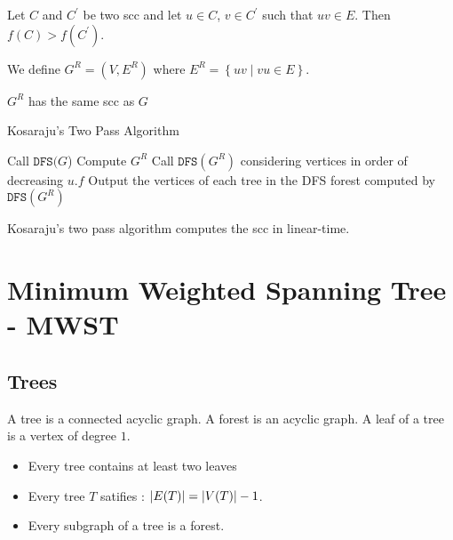 \documentclass[12pt]{cours}
\begin{document}
\begin{lemma}
    Let $C$ and $C^{'}$ be two scc and let $u \in C$, $v \in C^{'}$ such that $uv \in E$. Then $f(C) > f(C^{'})$.
\end{lemma}

\begin{definition}
    We define $G^{R} = \left(V, E^{R}\right)$ where $E^{R} = \left\{uv \mid vu \in E\right\}$.
\end{definition}

\begin{proposition}
    $G^{R}$ has the same scc as $G$
\end{proposition}

\begin{algorithm}
    \caption{Kosaraju's Two Pass Algorithm}
    \begin{algorithmic}
        \State Call $\texttt{DFS}(G$)
            \State Compute $G^{R}$
            \State Call $\texttt{DFS}(G^{R})$ considering vertices in order of decreasing $u.f$
            \Return Output the vertices of each tree in the DFS forest computed by $\texttt{DFS}(G^{R})$
    \end{algorithmic}
\end{algorithm}

\begin{theorem}
    Kosaraju's two pass algorithm computes the scc in linear-time.
\end{theorem}


\section{Minimum Weighted Spanning Tree - MWST}
\subsection{Trees}
\begin{definition}
    A tree is a connected acyclic graph. A forest is an acyclic graph. A leaf of a tree is a vertex of degree $1$.
\end{definition}

\begin{proposition}
    \begin{itemize}
        \item Every tree contains at least two leaves
        \item Every tree $T$ satifies : $\left|E(T)\right| = \left|V(T)\right| - 1$.
        \item Every subgraph of a tree is a forest.
    \end{itemize}
\end{proposition}
\end{document}
